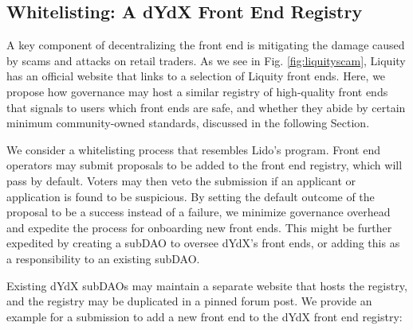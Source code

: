     \subsection{Whitelisting: A dYdX Front End Registry}

        A key component of decentralizing the front end is mitigating the damage caused by scams and attacks on retail traders. As we see in Fig. \ref{fig:liquityscam}, Liquity has an official website that links to a selection of Liquity front ends. Here, we propose how governance may host a similar registry of high-quality front ends that signals to users which front ends are safe, and whether they abide by certain minimum community-owned standards, discussed in the following Section.
        
        We consider a whitelisting process that resembles Lido's  program. Front end operators may submit proposals to be added to the front end registry, which will pass by default. Voters may then veto the submission if an applicant or application is found to be suspicious. By setting the default outcome of the proposal to be a success instead of a failure, we minimize governance overhead and expedite the process for onboarding new front ends. This might be further expedited by creating a subDAO to oversee dYdX's front ends, or adding this as a responsibility to an existing subDAO.
        
        Existing dYdX subDAOs may maintain a separate website that hosts the registry, and the registry may be duplicated in a pinned forum post. We provide an example for a submission to add a new front end to the dYdX front end registry:


